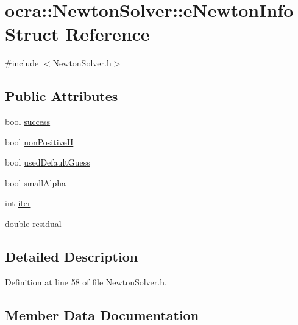 \hypertarget{structocra_1_1NewtonSolver_1_1eNewtonInfo}{}\section{ocra\+:\+:Newton\+Solver\+:\+:e\+Newton\+Info Struct Reference}
\label{structocra_1_1NewtonSolver_1_1eNewtonInfo}


{\ttfamily \#include $<$Newton\+Solver.\+h$>$}

\subsection*{Public Attributes}
\begin{DoxyCompactItemize}
\item 
bool \hyperlink{structocra_1_1NewtonSolver_1_1eNewtonInfo_ad3fb93c95fbe6e760caffc64fa1739cb}{success}
\item 
bool \hyperlink{structocra_1_1NewtonSolver_1_1eNewtonInfo_a088723d14881333ae7fcc9576c7142d0}{non\+PositiveH}
\item 
bool \hyperlink{structocra_1_1NewtonSolver_1_1eNewtonInfo_a210ebc2859be22918cc378fc16a5cf88}{used\+Default\+Guess}
\item 
bool \hyperlink{structocra_1_1NewtonSolver_1_1eNewtonInfo_a034b326acca364d57a7bdeea79849625}{small\+Alpha}
\item 
int \hyperlink{structocra_1_1NewtonSolver_1_1eNewtonInfo_a3ec8816b36812a608542479168a9c18d}{iter}
\item 
double \hyperlink{structocra_1_1NewtonSolver_1_1eNewtonInfo_a5b0d53fdf4347e5bc6f4d1af784eb517}{residual}
\end{DoxyCompactItemize}


\subsection{Detailed Description}


Definition at line 58 of file Newton\+Solver.\+h.



\subsection{Member Data Documentation}
